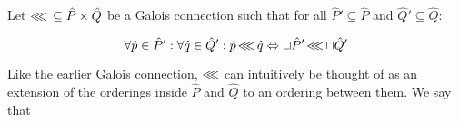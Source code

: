 



Let $\operatorname{\lll} \, \subseteq \hat P \times \hat Q$ be a Galois connection such that for all $\hat P' \subseteq \hat P$ and $\hat Q' \subseteq \hat Q$:

\begin{equation*}
\forall \hat p \in \hat P' : \forall \hat q \in \hat Q' : \hat p \operatorname{\lll} \hat q \Leftrightarrow \sqcup \hat P' \operatorname{\lll} \sqcap \hat Q'
\end{equation*}

\noindent Like the earlier Galois connection, $\operatorname{\lll}$ can intuitively be thought of as an extension of the orderings inside $\hat P$ and $\hat Q$ to an ordering between them. We say that 



